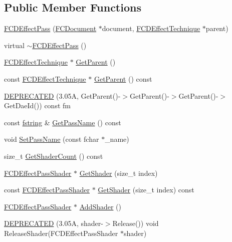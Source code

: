 \subsection*{Public Member Functions}
\begin{DoxyCompactItemize}
\item 
\hyperlink{classFCDEffectPass_a113ecf82cb3f9a875243fa9c392460d6}{FCDEffectPass} (\hyperlink{classFCDocument}{FCDocument} $\ast$document, \hyperlink{classFCDEffectTechnique}{FCDEffectTechnique} $\ast$parent)
\item 
virtual \hyperlink{classFCDEffectPass_a06f52bed17aedeb976700a42db076288}{$\sim$FCDEffectPass} ()
\item 
\hyperlink{classFCDEffectTechnique}{FCDEffectTechnique} $\ast$ \hyperlink{classFCDEffectPass_ad8c83b72090cee6340c41482c743b19d}{GetParent} ()
\item 
const \hyperlink{classFCDEffectTechnique}{FCDEffectTechnique} $\ast$ \hyperlink{classFCDEffectPass_ae3c3a6a9fc9aa96385908b866e730f69}{GetParent} () const 
\item 
\hyperlink{classFCDEffectPass_a2f2be39f5cb737d23be00822c429499f}{DEPRECATED} (3.05A, GetParent()-\/$>$GetParent()-\/$>$GetParent()-\/$>$GetDaeId()) const fm
\item 
const \hyperlink{classfm_1_1stringT}{fstring} \& \hyperlink{classFCDEffectPass_a965264f2ebd9bfab1eda85402b4e62b0}{GetPassName} () const 
\item 
void \hyperlink{classFCDEffectPass_a440924efb479a6417fb4c9de15cce12d}{SetPassName} (const fchar $\ast$\_\-name)
\item 
size\_\-t \hyperlink{classFCDEffectPass_a91266b26fcb7e861dd32d065f1d3e03a}{GetShaderCount} () const 
\item 
\hyperlink{classFCDEffectPassShader}{FCDEffectPassShader} $\ast$ \hyperlink{classFCDEffectPass_a4812f4512392d1c3599adc9411292742}{GetShader} (size\_\-t index)
\item 
const \hyperlink{classFCDEffectPassShader}{FCDEffectPassShader} $\ast$ \hyperlink{classFCDEffectPass_a594254479c6b9459963347609f013c0d}{GetShader} (size\_\-t index) const 
\item 
\hyperlink{classFCDEffectPassShader}{FCDEffectPassShader} $\ast$ \hyperlink{classFCDEffectPass_a3f517cc9def825f5ed1eff92fd63767f}{AddShader} ()
\item 
\hyperlink{classFCDEffectPass_ad750f820967f201bf16e11810bdd4e61}{DEPRECATED} (3.05A, shader-\/$>$Release()) void ReleaseShader(FCDEffectPassShader $\ast$shader)
\item 

\end{DoxyCompactItemize}

